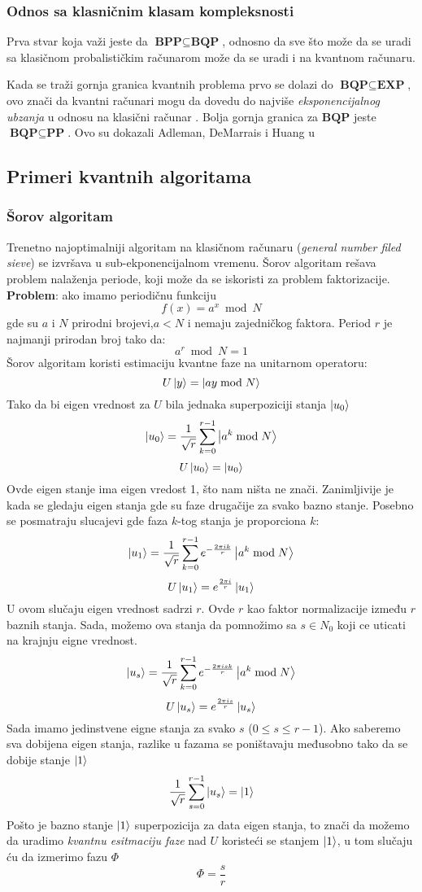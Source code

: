 \documentclass[12pt, letterpaper, oneside]{article}
\begin{document}
\subsubsection*{Odnos sa klasničnim klasam kompleksnosti}
Prva stvar koja važi jeste da $\textbf{BPP} \subseteq \textbf{BQP}$, odnosno da sve što može da se uradi sa klasičnom probalističkim računarom može da 
se uradi i na kvantnom računaru.

Kada se traži gornja granica kvantnih problema prvo se dolazi do $\textbf{BQP} \subseteq \textbf{EXP}$, ovo znači da kvantni računari mogu da dovedu
do najviše \textit{eksponencijalnog ubzanja} u odnosu na klasični računar \cite{aaronson2013quantum}.
Bolja gornja granica za $\textbf{BQP}$ jeste $\textbf{BQP} \subseteq \textbf{PP}$. Ovo su dokazali Adleman, DeMarrais i Huang u \cite{adleman1997quantum}
\subsection{Primeri kvantnih algoritama}
\subsubsection{Šorov algoritam}
Trenetno najoptimalniji algoritam na klasičnom računaru (\textit{general number filed sieve}) se izvršava u sub-ekponencijalnom vremenu.
Šorov algoritam rešava problem nalaženja periode, koji može da se iskoristi za problem faktorizacije. \cite{QiskiShoreAlgo} \\
\textbf{Problem}: ako imamo periodičnu funkciju
\[
    f(x) = a^x \bmod N
\]
gde su $a$ i $N$ prirodni brojevi,$a < N$ i nemaju zajedničkog faktora. Period $r$ je najmanji prirodan broj tako da:
\[
    a^r \bmod N = 1
\]
Šorov algoritam koristi estimaciju kvantne faze na unitarnom operatoru:
\[
    U\Ket{y} = \Ket{ay \bmod N}
\]
Tako da bi eigen vrednost za $U$ bila jednaka superpoziciji stanja $\Ket{u_0}$
\[
    \Ket{u_0}=\frac{1}{\sqrt{r}}\sum_{k=0}^{r-1}\Ket{a^k \bmod N}
\]
\[
    U\Ket{u_0} = \Ket{u_0}
\]
Ovde eigen stanje ima eigen vredost 1, što nam ništa ne znači. Zanimljivije je kada se gledaju eigen stanja
gde su faze drugačije za svako bazno stanje. Posebno se posmatraju slucajevi gde faza $k$-tog stanja je proporciona $k$:
\[
    \Ket{u_1}=\frac{1}{\sqrt{r}}\sum_{k=0}^{r-1}e^{-\frac{2\pi i k}{r}}\Ket{a^k \bmod N}
\]
\[
    U\Ket{u_1} = e^\frac{2\pi i}{r}\Ket{u_1}
\]
U ovom slučaju eigen vrednost sadrzi $r$. Ovde $r$ kao faktor normalizacije između $r$ baznih stanja.
Sada, možemo ova stanja da pomnožimo sa $s \in N_0$ koji ce uticati na krajnju eigne vrednost.
\[
    \Ket{u_s}=\frac{1}{\sqrt{r}}\sum_{k=0}^{r-1}e^{-\frac{2\pi isk}{r}}\Ket{a^k \bmod N}
\]
\[
    U\Ket{u_s} = e^\frac{2\pi is}{r}\Ket{u_s}
\]
Sada imamo jedinstvene eigne stanja za svako $s$ ($0 \leq s \leq r-1$). Ako saberemo sva dobijena eigen stanja, 
razlike u fazama se poništavaju međusobno tako da se dobije stanje $\Ket{1}$
\[
    \frac{1}{\sqrt{r}}\sum_{s=0}^{r-1}\Ket{u_s} = \Ket{1}
\]
Pošto je bazno stanje $\Ket{1}$ superpozicija za data eigen stanja, to znači da možemo da uradimo \textit{kvantnu esitmaciju faze} nad $U$
koristeći se stanjem $\Ket{1}$, u tom slučaju ću da izmerimo fazu $\Phi$
\[
    \Phi = \frac{s}{r}
\]
\end{document}
